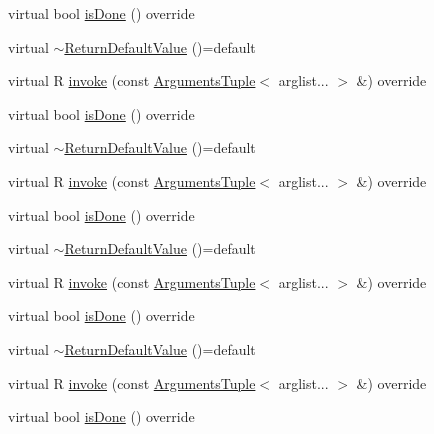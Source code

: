 \begin{DoxyCompactItemize}
\item 
virtual bool \mbox{\hyperlink{structfakeit_1_1ReturnDefaultValue_a7fbbfec578ab1944c73379d63185e06e}{is\+Done}} () override
\item 
virtual \mbox{\hyperlink{structfakeit_1_1ReturnDefaultValue_ae1985454992034296a118d73dbd21890}{$\sim$\+Return\+Default\+Value}} ()=default
\item 
virtual R \mbox{\hyperlink{structfakeit_1_1ReturnDefaultValue_a9b57c8c162e162b97415595f966e9c4a}{invoke}} (const \mbox{\hyperlink{namespacefakeit_a476a37a598825e1b5dd67b3a176491a1}{Arguments\+Tuple}}$<$ arglist... $>$ \&) override
\item 
virtual bool \mbox{\hyperlink{structfakeit_1_1ReturnDefaultValue_a7fbbfec578ab1944c73379d63185e06e}{is\+Done}} () override
\item 
virtual \mbox{\hyperlink{structfakeit_1_1ReturnDefaultValue_ae1985454992034296a118d73dbd21890}{$\sim$\+Return\+Default\+Value}} ()=default
\item 
virtual R \mbox{\hyperlink{structfakeit_1_1ReturnDefaultValue_a9b57c8c162e162b97415595f966e9c4a}{invoke}} (const \mbox{\hyperlink{namespacefakeit_a476a37a598825e1b5dd67b3a176491a1}{Arguments\+Tuple}}$<$ arglist... $>$ \&) override
\item 
virtual bool \mbox{\hyperlink{structfakeit_1_1ReturnDefaultValue_a7fbbfec578ab1944c73379d63185e06e}{is\+Done}} () override
\item 
virtual \mbox{\hyperlink{structfakeit_1_1ReturnDefaultValue_ae1985454992034296a118d73dbd21890}{$\sim$\+Return\+Default\+Value}} ()=default
\item 
virtual R \mbox{\hyperlink{structfakeit_1_1ReturnDefaultValue_a9b57c8c162e162b97415595f966e9c4a}{invoke}} (const \mbox{\hyperlink{namespacefakeit_a476a37a598825e1b5dd67b3a176491a1}{Arguments\+Tuple}}$<$ arglist... $>$ \&) override
\item 
virtual bool \mbox{\hyperlink{structfakeit_1_1ReturnDefaultValue_a7fbbfec578ab1944c73379d63185e06e}{is\+Done}} () override
\item 
virtual \mbox{\hyperlink{structfakeit_1_1ReturnDefaultValue_ae1985454992034296a118d73dbd21890}{$\sim$\+Return\+Default\+Value}} ()=default
\item 
virtual R \mbox{\hyperlink{structfakeit_1_1ReturnDefaultValue_a9b57c8c162e162b97415595f966e9c4a}{invoke}} (const \mbox{\hyperlink{namespacefakeit_a476a37a598825e1b5dd67b3a176491a1}{Arguments\+Tuple}}$<$ arglist... $>$ \&) override
\item 
virtual bool \mbox{\hyperlink{structfakeit_1_1ReturnDefaultValue_a7fbbfec578ab1944c73379d63185e06e}{is\+Done}} () override

\end{DoxyCompactItemize}
